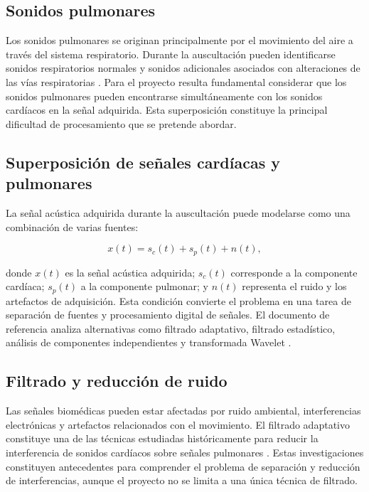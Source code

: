 \subsection{Sonidos pulmonares}

Los sonidos pulmonares se originan principalmente por el movimiento del aire a través del sistema respiratorio. Durante la auscultación pueden identificarse sonidos respiratorios normales y sonidos adicionales asociados con alteraciones de las vías respiratorias . Para el proyecto resulta fundamental considerar que los sonidos pulmonares pueden encontrarse simultáneamente con los sonidos cardíacos en la señal adquirida. Esta superposición constituye la principal dificultad de procesamiento que se pretende abordar.

\subsection{Superposición de señales cardíacas y pulmonares}

La señal acústica adquirida durante la auscultación puede modelarse como una combinación de varias fuentes:

\begin{equation}
    x(t) = s_c(t) + s_p(t) + n(t),
    \label{eq:mezcla-senales}
\end{equation}

donde $x(t)$ es la señal acústica adquirida; $s_c(t)$ corresponde a la componente cardíaca; $s_p(t)$ a la componente pulmonar; y $n(t)$ representa el ruido y los artefactos de adquisición. Esta condición convierte el problema en una tarea de separación de fuentes y procesamiento digital de señales. El documento de referencia analiza alternativas como filtrado adaptativo, filtrado estadístico, análisis de componentes independientes y transformada Wavelet .

\subsection{Filtrado y reducción de ruido}

Las señales biomédicas pueden estar afectadas por ruido ambiental, interferencias electrónicas y artefactos relacionados con el movimiento. El filtrado adaptativo constituye una de las técnicas estudiadas históricamente para reducir la interferencia de sonidos cardíacos sobre señales pulmonares . Estas investigaciones constituyen antecedentes para comprender el problema de separación y reducción de interferencias, aunque el proyecto no se limita a una única técnica de filtrado.

